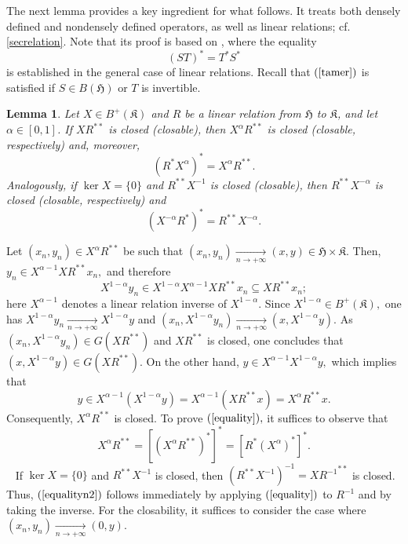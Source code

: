 \documentclass{amsart}
\makeatletter
\newtheorem{lemma}[theorem]{Lemma}
\newcommand{\h}{\mathfrak{H}}
\newcommand{\kk}{\mathfrak{K}}
\newcommand{\adj}{^*}
\newcommand{\inv}{^{-1}}
\newcommand{\clo}{^{**}}
\newcommand{\tstar}{T^{*}}
\newcommand{\inclu}{\subseteq}
\newcommand{\converge}{\underset{n \to + \infty} \longrightarrow}
\newcommand{\lplusk}{B^{+}(\kk)}
\numberwithin{equation}{section}
\renewenvironment{proof}[1][\proofname]{%
   \par\pushQED{\qed}\normalfont%
   \topsep6\p@\@plus6\p@\relax
   \trivlist\item[\hskip\labelsep\bfseries#1\@addpunct{.}]%
   \ignorespaces
}{%
   \popQED\endtrivlist\@endpefalse
}
\makeatother
\begin{document}
 The next lemma provides a key ingredient for what follows. It treats both densely defined and nondensely defined operators, as well as linear relations; cf. \cref{secrelation}.  Note that its  proof is based on \cite[Lemma 2.9]{hassiderkach2009}, where the equality
\begin{equation}\label{tamer}
  (ST)\adj = \tstar S\adj
\end{equation}
is established in the general  case of linear relations.    
Recall that $(\ref{tamer})$ is satisfied  if $S \in B(\h)$ or $T$ is invertible.


\begin{lemma}\label{relationalpha}
 Let $X \in \lplusk$ and $R $ be a linear relation from  $\h$ to $\kk$, and let $\alpha \in [0,1]$. If $X R\clo$ is closed (closable), then $X^\alpha R\clo$ is closed (closable, respectively) and, moreover,
  \begin{equation}\label{equality}
    (R\adj {X^\alpha})\adj=X^\alpha R\clo.
  \end{equation}
  Analogously, if $\ker X=\{0\}$ and  $R\clo X\inv $ is closed (closable), then $R\clo X^{-\alpha} $ is closed (closable, respectively) and
  \begin{equation} \label{equalityn2}
    (X^{-\alpha} R\adj )\adj=  R\clo X^{-\alpha}.
  \end{equation}
\end{lemma}


\begin{proof}
  Let $(x_n,y_n)   \in  X^\alpha R\clo$ be such that $(x_n,y_n) \converge (x,y) \in \h \times \kk.$ Then, $y_n \in X^{\alpha - 1} XR\clo x_n,$ and therefore
  $$
 X^{1- \alpha}y_n \in X^{1- \alpha}X^{\alpha - 1} XR\clo x_n \inclu XR\clo x_n;
  $$
  here $X^{\alpha - 1}$ denotes a linear relation inverse of $X^{1- \alpha}.$
  Since $X^{1- \alpha} \in \lplusk,$ one has  $X^{1- \alpha}y_n \converge X^{1- \alpha}y$  and   $(x_n,X^{1- \alpha}y_n) \converge (x, X^{1- \alpha}y).$   As $(x_n,X^{1- \alpha}y_n) \in G(XR\clo)$ and   $XR\clo$ is closed, one  concludes that  $(x, X^{1- \alpha}y) \in G(XR\clo).$   On the other hand, $ y \in X^{ \alpha-1} X^{1- \alpha}y,$ which implies that
  $$
  y \in X^{ \alpha-1} (X^{1- \alpha}y)= X^{ \alpha-1} ( XR\clo x) = X^\alpha R\clo x.
  $$
  Consequently,   $X^{ \alpha}R\clo$ is closed.
To prove $(\ref{equality}),$ it suffices to observe  that
   $$
        X^\alpha R\clo=  \left[ \left(X^\alpha R\clo\right)^* \right]^* = \left[ R\adj  (X^\alpha)\adj \right]\adj.
        $$
        \   \hspace*{0.4cm} If $\ker X=\{0\}$ and  $R\clo X\inv $ is closed, then $(R\clo X\inv)\inv= X {R\inv}\clo $ is closed.  Thus, $(\ref{equalityn2})$ follows immediately by applying $(\ref{equality})$ to   $R\inv$ and by taking the inverse. For the closability, it suffices to consider the case where  $(x_n,y_n) \converge (0,y).$
            \end{proof}
\end{document}
